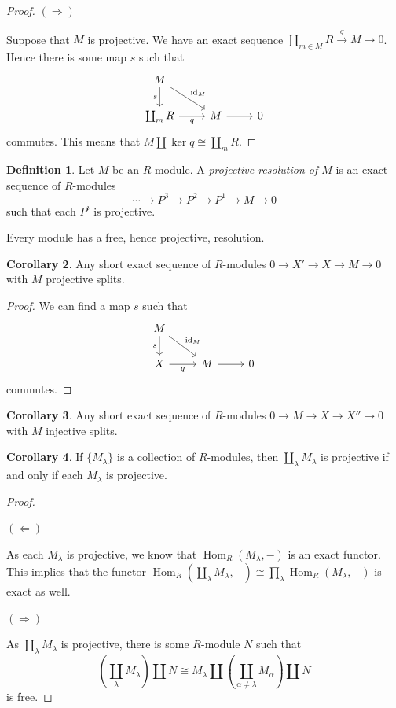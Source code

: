 \documentclass[10pt,letterpaper,cm]{nupset}
\theoremstyle{definition}
\newtheorem{definition}{Definition}[subsection]
\theoremstyle{theorem}
\newtheorem{corollary}[definition]{Corollary}
\theoremstyle{remark}
\newcommand{\1}{\mathbf{1}}
\newcommand{\0}{\vec 0}
\DeclareMathOperator{\id}{\mathrm{id}}
\DeclareMathOperator{\Hom}{Hom}
\begin{document}
\begin{proof}
\medskip

 $(\Longrightarrow)$ 
 
 Suppose that $M$ is projective. We have an exact sequence $\coprod_{m\in M}R \overset{q}{\longrightarrow}  M \to 0$. Hence there is some map $s$ such that 
\[\begin{tikzcd}
M \arrow[rd, "\id_M"] \arrow[d, "s"'] &  &  \\
\coprod_m R \arrow[r, "q"'] & M \arrow[r] & 0
\end{tikzcd}
\] commutes. This means that $M \coprod \ker{q} \cong \coprod_m R$.
\end{proof}

\begin{definition}
Let $M$ be an $R$-module. A \textit{projective resolution of $M$} is an exact sequence of $R$-modules $$\cdots \to P^3 \to P^2 \to P^1 \to M \to 0$$ such that each $P^i$ is projective.  
\end{definition}


Every module has a free, hence projective, resolution. 


\begin{corollary}
Any short exact sequence of $R$-modules $0 \to X' \to X \to M \to 0$ with $M$ projective splits. 
\end{corollary}
\begin{proof}
We can find a map $s$ such that
\[\begin{tikzcd}
M \arrow[rd, "\id_M"] \arrow[d, "s"'] &  &  \\
X \arrow[r, "q"'] & M \arrow[r] & 0
\end{tikzcd}
\] commutes. 
\end{proof}

\begin{corollary}
Any short exact sequence of $R$-modules $0 \to M \to X \to X'' \to 0$ with $M$ injective splits. 
\end{corollary}

\begin{corollary}
If $\{M_{\lambda}\}$ is a collection of $R$-modules, then $\coprod_{\lambda} M_{\lambda}$ is projective  if and only if each $M_{\lambda}$ is projective. 
\end{corollary}
\begin{proof} $ $

\smallskip

$(\Longleftarrow)$ 

As each $M_{\lambda}$ is projective, we know that $\Hom_R(M_{\lambda}, -)$ is an exact functor. This implies that the functor $\Hom_R(\coprod_{\lambda} M_{\lambda}, {-}) \cong \prod_{\lambda} \Hom_R(M_{\lambda}, -)$ is exact as well.

\medskip

 
$(\Longrightarrow)$ 

As $\coprod_{\lambda} M_{\lambda}$ is projective, there is some $R$-module $N$ such that $$\left(\coprod_{\lambda} M_{\lambda}\right) \coprod N \cong M_{\lambda} \coprod  \left(\coprod_{\alpha \ne \lambda} M_{\alpha}\right)\coprod N$$ is free.
\end{proof}
\end{document}
